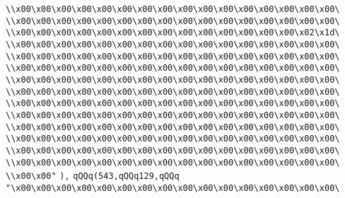 \verb|\\x00\x00\x00\x00\x00\x00\x00\x00\x00\x00\x00\x00\x00\x00\x00\x00\|\newline
\verb|\\x00\x00\x00\x00\x00\x00\x00\x00\x00\x00\x00\x00\x00\x00\x00\x00\|\newline
\verb|\\x00\x00\x00\x00\x00\x00\x00\x00\x00\x00\x00\x00\x00\x00\x02\x1d\|\newline
\verb|\\x00\x00\x00\x00\x00\x00\x00\x00\x00\x00\x00\x00\x00\x00\x00\x00\|\newline
\verb|\\x00\x00\x00\x00\x00\x00\x00\x00\x00\x00\x00\x00\x00\x00\x00\x00\|\newline
\verb|\\x00\x00\x00\x00\x00\x00\x00\x00\x00\x00\x00\x00\x00\x00\x00\x00\|\newline
\verb|\\x00\x00\x00\x00\x00\x00\x00\x00\x00\x00\x00\x00\x00\x00\x00\x00\|\newline
\verb|\\x00\x00\x00\x00\x00\x00\x00\x00\x00\x00\x00\x00\x00\x00\x00\x00\|\newline
\verb|\\x00\x00\x00\x00\x00\x00\x00\x00\x00\x00\x00\x00\x00\x00\x00\x00\|\newline
\verb|\\x00\x00\x00\x00\x00\x00\x00\x00\x00\x00\x00\x00\x00\x00\x00\x00\|\newline
\verb|\\x00\x00\x00\x00\x00\x00\x00\x00\x00\x00\x00\x00\x00\x00\x00\x00\|\newline
\verb|\\x00\x00\x00\x00\x00\x00\x00\x00\x00\x00\x00\x00\x00\x00\x00\x00\|\newline
\verb|\\x00\x00\x00\x00\x00\x00\x00\x00\x00\x00\x00\x00\x00\x00\x00\x00\|\newline
\verb|\\x00\x00\x00\x00\x00\x00\x00\x00\x00\x00\x00\x00\x00\x00\x00\x00\|\newline
\verb|\\x00\x00"|\newline
\verb|),|\newline
\verb|qQQq(543,qQQq129,qQQq|\newline
\verb|"\x00\x00\x00\x00\x00\x00\x00\x00\x00\x00\x00\x00\x00\x00\x00\x00\|\newline
